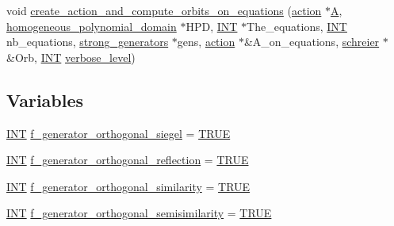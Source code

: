 \begin{DoxyCompactItemize}
void \mbox{\hyperlink{action__global_8_c_a510dc360d7da8778e923063db39ddb72}{create\+\_\+action\+\_\+and\+\_\+compute\+\_\+orbits\+\_\+on\+\_\+equations}} (\mbox{\hyperlink{classaction}{action}} $\ast$\mbox{\hyperlink{simeon_8_c_a97833f04c3a9c008df5521a2fc291bb4}{A}}, \mbox{\hyperlink{classhomogeneous__polynomial__domain}{homogeneous\+\_\+polynomial\+\_\+domain}} $\ast$H\+PD, \mbox{\hyperlink{galois_8h_a09fddde158a3a20bd2dcadb609de11dc}{I\+NT}} $\ast$The\+\_\+equations, \mbox{\hyperlink{galois_8h_a09fddde158a3a20bd2dcadb609de11dc}{I\+NT}} nb\+\_\+equations, \mbox{\hyperlink{classstrong__generators}{strong\+\_\+generators}} $\ast$gens, \mbox{\hyperlink{classaction}{action}} $\ast$\&A\+\_\+on\+\_\+equations, \mbox{\hyperlink{classschreier}{schreier}} $\ast$\&Orb, \mbox{\hyperlink{galois_8h_a09fddde158a3a20bd2dcadb609de11dc}{I\+NT}} \mbox{\hyperlink{simeon_8_c_a818073fbcc2f439e7c56952f67386122}{verbose\+\_\+level}})
\end{DoxyCompactItemize}
\subsection*{Variables}
\begin{DoxyCompactItemize}
\item 
\mbox{\hyperlink{galois_8h_a09fddde158a3a20bd2dcadb609de11dc}{I\+NT}} \mbox{\hyperlink{action__global_8_c_a8aed3d2cc8871b7dd3cb16d9f7867891}{f\+\_\+generator\+\_\+orthogonal\+\_\+siegel}} = \mbox{\hyperlink{nauty_8h_aa8cecfc5c5c054d2875c03e77b7be15d}{T\+R\+UE}}
\item 
\mbox{\hyperlink{galois_8h_a09fddde158a3a20bd2dcadb609de11dc}{I\+NT}} \mbox{\hyperlink{action__global_8_c_af62154fb706a07f3006fbaea4211eba2}{f\+\_\+generator\+\_\+orthogonal\+\_\+reflection}} = \mbox{\hyperlink{nauty_8h_aa8cecfc5c5c054d2875c03e77b7be15d}{T\+R\+UE}}
\item 
\mbox{\hyperlink{galois_8h_a09fddde158a3a20bd2dcadb609de11dc}{I\+NT}} \mbox{\hyperlink{action__global_8_c_abd8d2911451c9e5fa22b7766b676fc3d}{f\+\_\+generator\+\_\+orthogonal\+\_\+similarity}} = \mbox{\hyperlink{nauty_8h_aa8cecfc5c5c054d2875c03e77b7be15d}{T\+R\+UE}}
\item 
\mbox{\hyperlink{galois_8h_a09fddde158a3a20bd2dcadb609de11dc}{I\+NT}} \mbox{\hyperlink{action__global_8_c_a917102d3fb580f06c1c06fdd1719d848}{f\+\_\+generator\+\_\+orthogonal\+\_\+semisimilarity}} = \mbox{\hyperlink{nauty_8h_aa8cecfc5c5c054d2875c03e77b7be15d}{T\+R\+UE}}
\end{DoxyCompactItemize}



